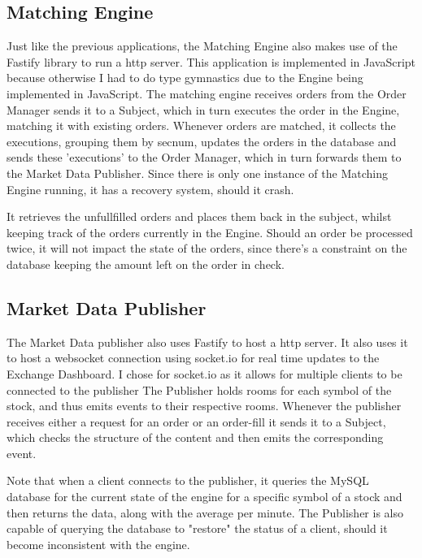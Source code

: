 \documentclass{article}
\begin{document}
\subsection{Matching Engine}
Just like the previous applications, the Matching Engine also makes use of the Fastify library to run a http server. This application is implemented in JavaScript because otherwise I had to do type gymnastics due to the Engine being implemented in JavaScript.
The matching engine receives orders from the Order Manager sends it to a Subject, which in turn executes the order in the Engine, matching it with existing orders.
Whenever orders are matched, it collects the executions, grouping them by secnum, updates the orders in the database and sends these 'executions' to the Order Manager, which in turn forwards them to the Market Data Publisher.
Since there is only one instance of the Matching Engine running, it has a recovery system, should it crash.
\par
It retrieves the unfullfilled orders and places them back in the subject, whilst keeping track of the orders currently in the Engine.
Should an order be processed twice, it will not impact the state of the orders, since there's a constraint on the database keeping the amount left on the order in check.
\subsection{Market Data Publisher}
The Market Data publisher also uses Fastify to host a http server.
It also uses it to host a websocket connection using socket.io for real time updates to the Exchange Dashboard.
I chose for socket.io as it allows for multiple clients to be connected to the publisher
The Publisher holds rooms for each symbol of the stock, and thus emits events to their respective rooms.
Whenever the publisher receives either a request for an order or an order-fill it sends it to a Subject, which checks the structure of the content and then emits the corresponding event.
\par
Note that when a client connects to the publisher, it queries the MySQL database for the current state of the engine for a specific symbol of a stock and then returns the data, along with the average per minute.
The Publisher is also capable of querying the database to "restore" the status of a client, should it become inconsistent with the engine.
\end{document}
